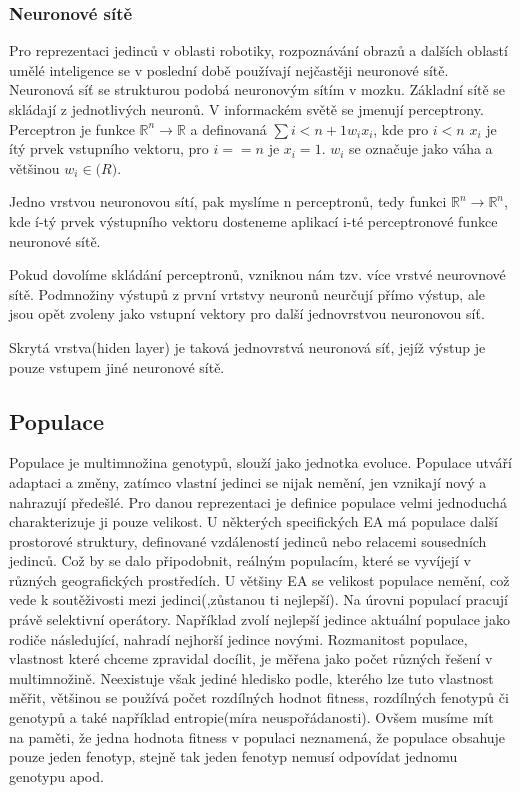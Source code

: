 \subsubsection{Neuronové sítě} Pro reprezentaci jedinců v oblasti robotiky, rozpoznávání obrazů a dalších oblastí umělé inteligence se v poslední době používají nejčastěji neuronové sítě. Neuronová síť se strukturou podobá neuronovým sítím v mozku. Základní sítě se skládají z jednotlivých neuronů. V informackém světě se jmenují perceptrony. Perceptron je funkce $\mathbb{R}^n \rightarrow \mathbb{R}$ a definovaná $\sum{i < n+1} w_{i} x_{i}$, kde pro $i < n$ $x_{i}$ je ítý prvek vstupního vektoru, pro  $i == n$ je $x_{i}=1$. $w_{i}$ se označuje jako váha a většinou $w_{i} \in \mathbb(R)$. \par
Jedno vrstvou neuronovou sítí, pak myslíme n perceptronů, tedy funkci $\mathbb{R}^{n} \rightarrow \mathbb{R}^{n}$, kde í-tý prvek výstupního vektoru dosteneme aplikací i-té perceptronové funkce neuronové sítě. \par 
Pokud dovolíme skládání perceptronů, vzniknou nám tzv. více vrstvé neurovnové sítě. Podmnožiny výstupů z první vrtstvy neuronů neurčují přímo výstup, ale jsou opět zvoleny jako vstupní vektory pro další jednovrstvou neuronovou síť. \par
Skrytá vrstva(hiden layer) je taková jednovrstvá neuronová síť, jejíž výstup je pouze vstupem jiné neuronové sítě. \par
\subsection{Populace}
Populace je multimnožina genotypů, slouží jako jednotka evoluce. Populace utváří adaptaci a změny, zatímco vlastní jedinci se nijak nemění, jen vznikají nový a nahrazují předešlé. Pro danou reprezentaci je definice populace velmi jednoduchá charakterizuje ji pouze velikost. U některých specifických EA má populace další prostorové struktury, definované vzdáleností jedinců nebo relacemi sousedních jedinců. Což by se dalo připodobnit, reálným populacím, které se vyvíjejí v různých geografických prostředích. U většiny EA se velikost populace nemění, což vede k soutěživosti mezi jedinci(,zůstanou ti nejlepší). Na úrovni populací pracují právě selektivní operátory. Například zvolí nejlepší jedince aktuální populace jako rodiče následující, nahradí nejhorší jedince novými. Rozmanitost populace, vlastnost které chceme zpravidal docílit, je měřena jako počet různých řešení v multimnožině. Neexistuje však jediné hledisko podle, kterého lze tuto vlastnost měřit, většinou se používá počet rozdílných hodnot fitness, rozdílných fenotypů či genotypů a také například entropie(míra neuspořádanosti). Ovšem musíme mít na paměti, že jedna hodnota fitness v populaci neznamená, že populace obsahuje pouze jeden fenotyp, stejně tak jeden fenotyp nemusí odpovídat jednomu genotypu apod. 
